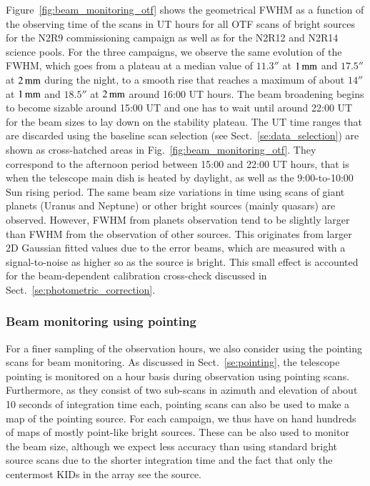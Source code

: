 Figure~\ref{fig:beam_monitoring_otf} shows the geometrical FWHM as a
function of the observing time of the scans in UT hours for all OTF
scans of bright sources for the N2R9 commissioning campaign as well
as for the N2R12 and N2R14 science pools. For the three campaigns, we
observe the same evolution of the FWHM, which goes from a plateau at a
median value of $11.3''$ at $1\,\rm{mm}$ and $17.5''$ at $2\,\rm{mm}$
during the night, to a smooth rise that reaches a maximum of about $14''$
at $1\,\rm{mm}$ and $18.5''$ at $2\,\rm{mm}$ around 16:00 UT
hours. The beam broadening begins to become sizable around 15:00 UT
and one has to wait until around 22:00 UT for the beam sizes to lay
down on the stability plateau. The UT time ranges that are discarded
using the baseline scan selection (see
Sect.~\ref{se:data_selection}) are shown as cross-hatched areas in
Fig.~\ref{fig:beam_monitoring_otf}. They correspond to the afternoon
period between 15:00 and 22:00 UT hours, that is when the
telescope main dish is heated by daylight, as well as the
9:00-to-10:00 Sun rising period. The same beam size variations in time
using scans of giant planets (Uranus and Neptune) or other bright
sources (mainly quasars) are observed. However, FWHM from planets
observation tend to be slightly larger than FWHM from the observation
of other sources. This originates from larger 2D Gaussian fitted
values due to the error beams, which are measured with a
signal-to-noise as higher so as the source is bright. This small
effect is accounted for the beam-dependent calibration cross-check
discussed in Sect.~\ref{se:photometric_correction}.


\subsubsection{Beam monitoring using pointing}
\label{se:beam_monitoring_pointing}

For a finer sampling of the observation hours, we also consider using
the pointing scans for beam monitoring. As discussed in
Sect.~\ref{se:pointing}, the telescope pointing is
monitored on a hour basis during observation using pointing
scans. Furthermore, as they consist of two sub-scans in azimuth and
elevation of about 10 seconds of integration time each, pointing scans
can also be used to make a map of the pointing source. For each campaign,
we thus have on hand hundreds of maps of mostly point-like bright
sources. These can be also used to monitor the beam size, although we
expect less accuracy than using standard bright source scans due to the
shorter integration time and the fact that only the centermost KIDs in
the array see the source.  

